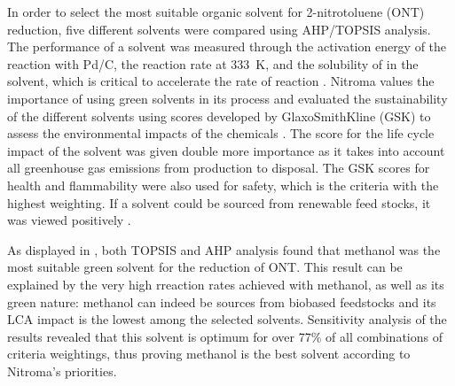 In order to select the most suitable organic solvent for 2-nitrotoluene (ONT) reduction, five different solvents were compared using AHP/TOPSIS analysis. The performance of a solvent was measured through the activation energy of the reaction with Pd/C, the reaction rate at \SI{333}{\K}, and the solubility of  in the solvent, which is critical to accelerate the rate of reaction \cite{rajadhyaksha_solvent_1986}. Nitroma values the importance of using green solvents in its process and evaluated the sustainability of the different solvents using scores developed by GlaxoSmithKline (GSK) to assess the environmental impacts of the chemicals \cite{henderson_expanding_2011}. The score for the life cycle impact of the solvent was given double more importance as it takes into account all greenhouse gas emissions from production to disposal. The GSK scores for health and flammability were also used for safety, which is the criteria with the highest weighting. If a solvent could be sourced from renewable feed stocks, it was viewed positively \cite{byrne_tools_2016}. %

As displayed in , both TOPSIS and AHP analysis found that methanol was the most suitable green solvent for the reduction of ONT. This result can be explained by the very high rreaction rates achieved with methanol, as well as its green nature: methanol can indeed be sources from biobased feedstocks and its LCA impact is the lowest among the selected solvents. Sensitivity analysis of the results revealed that this solvent is optimum for over 77\% of all combinations of criteria weightings, thus proving methanol is the best solvent according to Nitroma's priorities. 



